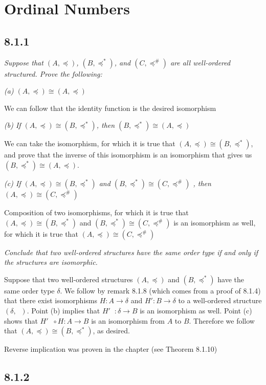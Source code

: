 \documentclass[11pt,oneside,titlepage]{book}
\DeclareMathOperator \inv {^{-1}}
\DeclareMathOperator \ineq {\underline{\in}}
\begin{document}
\section{Ordinal Numbers}

\subsection*{8.1.1}

\textit{Suppose that $(A, \preceq)$, $(B, \preceq^*)$, and $(C, \preceq^\#)$ are all
  well-ordered structured. Prove the following: }

\textit{(a) $(A, \preceq) \cong (A, \preceq)$}

We can follow that the identity function is the desired isomorphism

\textit{(b) If $(A, \preceq) \cong (B, \preceq^*)$, then $(B, \preceq^*) \cong (A, \preceq)$}

We can take the isomorphism, for which it is true that
$(A, \preceq) \cong (B, \preceq^*)$, and prove that the inverse of this isomorphism is
an isomorphism that gives us
$(B, \preceq^*) \cong (A, \preceq)$.

\textit{(c) If $(A, \preceq) \cong (B, \preceq^*)$ and $(B, \preceq^*) \cong (C, \preceq^\#)$ ,
  then $(A, \preceq) \cong (C, \preceq^\#)$}

Composition of two isomorphisms, for which it is true that
$(A, \preceq) \cong (B, \preceq^*)$ and $(B, \preceq^*) \cong (C, \preceq^\#)$
is an isomorphism as well, for which it is true that
$(A, \preceq) \cong (C, \preceq^\#)$

\textit{Conclude that two well-ordered structures have the same order type if and only if
  the structures are isomorphic.}

Suppose that two well-ordered structures $(A, \preceq)$ and $(B, \preceq^*)$ have
the same order type $\delta$. We follow by remark 8.1.8 (which comes from a proof of 8.1.4)
that there exist isomorphisms
$H: A \to \delta$ and $H': B \to \delta$ to a well-ordered structure $(\delta, \ineq)$.
Point (b) implies that $H'\inv: \delta \to B$ is an isomorphism as well. Point (c)
shows that $H'\inv \circ H: A \to B$ is an isomorphism from $A$ to $B$. Therefore we
follow that $(A, \preceq) \cong (B, \preceq^*)$, as desired.

Reverse implication was proven in the chapter (see Theorem 8.1.10)

\subsection*{8.1.2}
\end{document}
